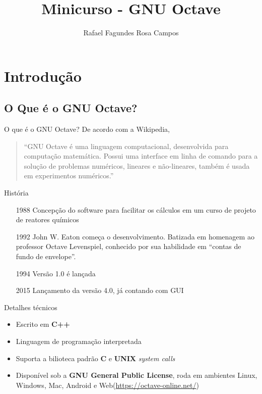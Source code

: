 \documentclass{beamer}
\title{Minicurso - GNU Octave}
\author{Rafael Fagundes Rosa Campos}
\date{}
\begin{document}
 \frame{\titlepage}
 
 \frame{\tableofcontents}
  
  \section{Introdução}
   \subsection{O Que é o GNU Octave?}
    \begin{frame}{O que é o GNU Octave?}
     De acordo com a Wikipedia,
     \begin{quote}
      ``GNU Octave é uma linguagem computacional, desenvolvida para computação matemática. Possui uma interface em linha de comando para a solução de problemas numéricos, lineares e não-lineares, também é usada em experimentos numéricos.''
     \end{quote}
   \end{frame}
   
   \begin{frame}{História}
     \begin{itemize}
      \item[1988] Concepção do software para facilitar os cálculos em um curso de projeto de reatores químicos \pause
      \item[1992] John W. Eaton começa o desenvolvimento. Batizada em homenagem ao professor Octave Levenspiel, conhecido por sua habilidade em ``contas de fundo de envelope''. \pause
      \item[1994] Versão 1.0 é lançada \pause
      \item[2015] Lançamento da versão 4.0, já contando com GUI
     \end{itemize}
   \end{frame}
   
   \begin{frame}{Detalhes técnicos}
    \begin{itemize}
     \item Escrito em \textbf{C++} \pause
     \item Linguagem de programação interpretada \pause
     \item Suporta a bilioteca padrão \textbf{C} e \textbf{UNIX} \textit{system calls} \pause
     \item Disponível sob a \textbf{GNU General Public License}, roda em ambientes Linux, Windows, Mac, Android e Web(\url{https://octave-online.net/})
    \end{itemize}
   \end{frame}
\end{document}
